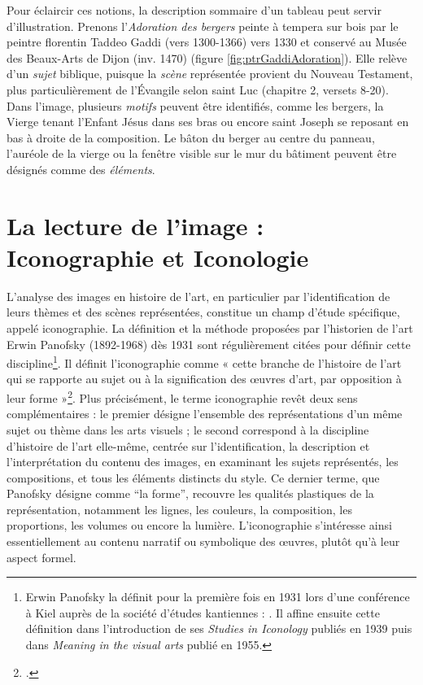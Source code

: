 Pour éclaircir ces notions, la description sommaire d’un tableau peut servir d’illustration. Prenons l’\textit{Adoration des bergers} peinte à tempera sur bois par le peintre florentin Taddeo Gaddi (vers 1300-1366) vers 1330 et conservé au Musée des Beaux-Arts de Dijon (inv. 1470) (figure \ref{fig:ptrGaddiAdoration}). Elle relève d’un \textit{sujet} biblique, puisque la \textit{scène} représentée provient du Nouveau Testament, plus particulièrement de l’Évangile selon saint Luc (chapitre 2, versets 8-20). Dans l’image, plusieurs \textit{motifs} peuvent être identifiés, comme les bergers, la Vierge tenant l’Enfant Jésus dans ses bras ou encore saint Joseph se reposant en bas à droite de la composition. Le bâton du berger au centre du panneau, l’auréole de la vierge ou la fenêtre visible sur le mur du bâtiment peuvent être désignés comme des \textit{éléments}.

\section[Iconographie et Iconologie]{La lecture de l'image :  Iconographie et Iconologie}

L’analyse des images en histoire de l’art, en particulier par l’identification de leurs thèmes et des scènes représentées, constitue un champ d’étude spécifique, appelé iconographie. La définition et la méthode proposées par l’historien de l’art Erwin Panofsky (1892-1968) dès 1931 sont régulièrement citées pour définir cette discipline\footnote{Erwin Panofsky la définit pour la première fois en 1931 lors d’une conférence à Kiel auprès de la société d’études kantiennes : \cite{panofskyProblemBeschreibungUnd1932}. Il affine ensuite cette définition dans l'introduction de ses \textit{Studies in Iconology} publiés en 1939 puis dans \textit{Meaning in the visual arts} publié en 1955.}. Il définit l’iconographie comme « cette branche de l’histoire de l’art qui se rapporte au sujet ou à la signification des œuvres d’art, par opposition à leur forme »\footcite[p. 19]{panofskyEssaisDiconologieThemes2021}. Plus précisément, le terme iconographie revêt deux sens complémentaires : le premier désigne l’ensemble des représentations d’un même sujet ou thème dans les arts visuels ; le second correspond à la discipline d’histoire de l’art elle-même, centrée sur l’identification, la description et l’interprétation du contenu des images, en examinant les sujets représentés, les compositions, et tous les éléments distincts du style. Ce dernier terme, que Panofsky désigne comme “la forme”, recouvre les qualités plastiques de la représentation, notamment les lignes, les couleurs, la composition, les proportions, les volumes ou encore la lumière. L’iconographie s’intéresse ainsi essentiellement au contenu narratif ou symbolique des œuvres, plutôt qu’à leur aspect formel. 

